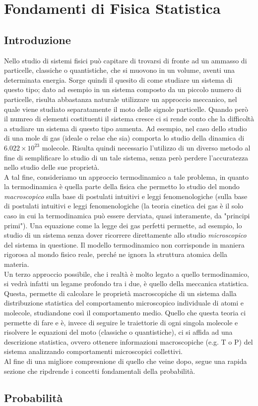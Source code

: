 \chapter{Fondamenti di Fisica Statistica}
\section{Introduzione}

Nello studio di sistemi fisici può capitare di trovarsi di fronte ad un ammasso di particelle, classiche o quantistiche, che si muovono in un volume, aventi una determinata energia. Sorge quindi il quesito di come studiare un sistema di questo tipo; dato ad esempio in un sistema composto da un piccolo numero di particelle, risulta abbastanza naturale utilizzare un approccio meccanico, nel quale viene studiato separatamente il moto delle signole particelle. Quando però il numreo di elementi costituenti il sistema cresce ci si rende conto che la difficoltà a studiare un sistema di questo tipo aumenta. Ad esempio, nel caso dello studio di una mole di gas (ideale o relae che sia) comporta lo studio della dinamica di $6.022\times 10^{23}$ molecole. Risulta quindi necessario l'utilizzo di un diverso metodo al fine di semplificare lo studio di un tale sistema, senza però perdere l'accuratezza nello studio delle sue proprietà.
\\
A tal fine, consideriamo un approccio termodinamico a tale problema, in quanto la termodinamica è quella parte della fisica che permetto lo studio del mondo \textit{macroscopico} sulla base di postulati intuitivi e leggi fenomenologiche (sulla base di postulati intuitivi e leggi fenomenologiche (la teoria cinetica dei gas è il solo caso in cui la termodinamica può essere derviata, quasi interamente, da "principi primi"). Una equazione come la legge dei gas perfetti permette, ad esempio, lo studio di un sistema senza dover ricorrere direttamente allo studio \textit{microscopico} del sistema in questione. Il modello termodinamico non corrisponde in maniera rigorosa al mondo fisico reale, perché ne ignora la struttura atomica della materia.
\\
Un terzo approccio possibile, che i  realtà è molto legato a quello termodinamico, si vedrà infatti un legame profondo tra i due, è quello della meccanica statistica. Questa, permette di calcolare le proprietà macroscopiche di un sistema dalla distribuzione statistica del comportamento microscopico individuale di atomi e molecole, studiandone così il comportamento medio. Quello che questa teoria ci permette di fare e è, invece di seguire le traiettorie di ogni singola molecole e risolvere le equazioni del moto (classiche o quantistiche), ci si a ffida ad una descrizione statistica, ovvero ottenere informazioni macroscopiche (e.g. T o P) del sistema analizzando comportamenti microscopici collettivi.
\\
Al fine di una migliore compresnione di quello che veine dopo, segue una rapida sezione che ripdrende i concetti fondamentali della probabilità.
\section{Probabilità}
